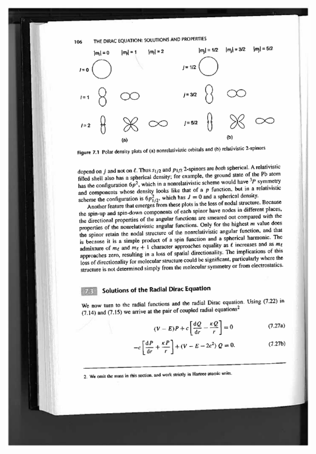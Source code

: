 \documentclass[mathserif,8pt]{beamer}
\begin{document}
\begin{frame}
\begin{columns}
\begin{column}{.50\textwidth}
	\includegraphics[viewport = 120 535 470 685, clip, scale=0.4, angle=-2]{figures/relativistic_orbitals.pdf}
    \end{column}
    \end{columns}
\end{frame}
\end{document}
